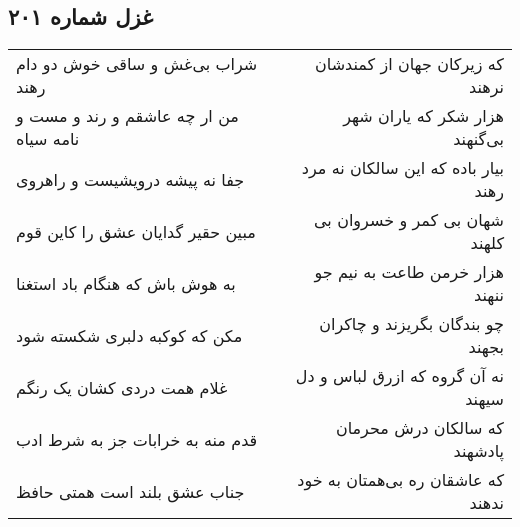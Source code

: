 \begin{center}
\section*{غزل شماره ۲۰۱}
\label{sec:sh201}
\begin{longtable}{l p{0.5cm} r}
شراب بی‌غش و ساقی خوش دو دام رهند
&&
که زیرکان جهان از کمندشان نرهند
\\
من ار چه عاشقم و رند و مست و نامه سیاه
&&
هزار شکر که یاران شهر بی‌گنهند
\\
جفا نه پیشه درویشیست و راهروی
&&
بیار باده که این سالکان نه مرد رهند
\\
مبین حقیر گدایان عشق را کاین قوم
&&
شهان بی کمر و خسروان بی کلهند
\\
به هوش باش که هنگام باد استغنا
&&
هزار خرمن طاعت به نیم جو ننهند
\\
مکن که کوکبه دلبری شکسته شود
&&
چو بندگان بگریزند و چاکران بجهند
\\
غلام همت دردی کشان یک رنگم
&&
نه آن گروه که ازرق لباس و دل سیهند
\\
قدم منه به خرابات جز به شرط ادب
&&
که سالکان درش محرمان پادشهند
\\
جناب عشق بلند است همتی حافظ
&&
که عاشقان ره بی‌همتان به خود ندهند
\\
\end{longtable}
\end{center}
